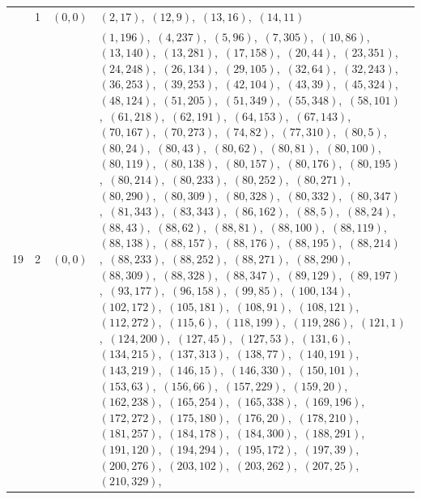 \documentclass[11pt]{article}
\begin{document}
\begin{longtable}{@{}rrl>{\raggedright\arraybackslash}p{}@{}}
\addlinespace[3pt]
19 & 1 & $(0,0)$ & $(2,17)$,\allowbreak\ $(12,9)$,\allowbreak\ $(13,16)$,\allowbreak\ $(14,11)$\\
19 & 2 & $(0,0)$ & $(1,196)$,\allowbreak\ $(4,237)$,\allowbreak\ $(5,96)$,\allowbreak\ $(7,305)$,\allowbreak\ $(10,86)$,\allowbreak\ $(13,140)$,\allowbreak\ $(13,281)$,\allowbreak\ $(17,158)$,\allowbreak\ $(20,44)$,\allowbreak\ $(23,351)$,\allowbreak\ $(24,248)$,\allowbreak\ $(26,134)$,\allowbreak\ $(29,105)$,\allowbreak\ $(32,64)$,\allowbreak\ $(32,243)$,\allowbreak\ $(36,253)$,\allowbreak\ $(39,253)$,\allowbreak\ $(42,104)$,\allowbreak\ $(43,39)$,\allowbreak\ $(45,324)$,\allowbreak\ $(48,124)$,\allowbreak\ $(51,205)$,\allowbreak\ $(51,349)$,\allowbreak\ $(55,348)$,\allowbreak\ $(58,101)$,\allowbreak\ $(61,218)$,\allowbreak\ $(62,191)$,\allowbreak\ $(64,153)$,\allowbreak\ $(67,143)$,\allowbreak\ $(70,167)$,\allowbreak\ $(70,273)$,\allowbreak\ $(74,82)$,\allowbreak\ $(77,310)$,\allowbreak\ $(80,5)$,\allowbreak\ $(80,24)$,\allowbreak\ $(80,43)$,\allowbreak\ $(80,62)$,\allowbreak\ $(80,81)$,\allowbreak\ $(80,100)$,\allowbreak\ $(80,119)$,\allowbreak\ $(80,138)$,\allowbreak\ $(80,157)$,\allowbreak\ $(80,176)$,\allowbreak\ $(80,195)$,\allowbreak\ $(80,214)$,\allowbreak\ $(80,233)$,\allowbreak\ $(80,252)$,\allowbreak\ $(80,271)$,\allowbreak\ $(80,290)$,\allowbreak\ $(80,309)$,\allowbreak\ $(80,328)$,\allowbreak\ $(80,332)$,\allowbreak\ $(80,347)$,\allowbreak\ $(81,343)$,\allowbreak\ $(83,343)$,\allowbreak\ $(86,162)$,\allowbreak\ $(88,5)$,\allowbreak\ $(88,24)$,\allowbreak\ $(88,43)$,\allowbreak\ $(88,62)$,\allowbreak\ $(88,81)$,\allowbreak\ $(88,100)$,\allowbreak\ $(88,119)$,\allowbreak\ $(88,138)$,\allowbreak\ $(88,157)$,\allowbreak\ $(88,176)$,\allowbreak\ $(88,195)$,\allowbreak\ $(88,214)$,\allowbreak\ $(88,233)$,\allowbreak\ $(88,252)$,\allowbreak\ $(88,271)$,\allowbreak\ $(88,290)$,\allowbreak\ $(88,309)$,\allowbreak\ $(88,328)$,\allowbreak\ $(88,347)$,\allowbreak\ $(89,129)$,\allowbreak\ $(89,197)$,\allowbreak\ $(93,177)$,\allowbreak\ $(96,158)$,\allowbreak\ $(99,85)$,\allowbreak\ $(100,134)$,\allowbreak\ $(102,172)$,\allowbreak\ $(105,181)$,\allowbreak\ $(108,91)$,\allowbreak\ $(108,121)$,\allowbreak\ $(112,272)$,\allowbreak\ $(115,6)$,\allowbreak\ $(118,199)$,\allowbreak\ $(119,286)$,\allowbreak\ $(121,1)$,\allowbreak\ $(124,200)$,\allowbreak\ $(127,45)$,\allowbreak\ $(127,53)$,\allowbreak\ $(131,6)$,\allowbreak\ $(134,215)$,\allowbreak\ $(137,313)$,\allowbreak\ $(138,77)$,\allowbreak\ $(140,191)$,\allowbreak\ $(143,219)$,\allowbreak\ $(146,15)$,\allowbreak\ $(146,330)$,\allowbreak\ $(150,101)$,\allowbreak\ $(153,63)$,\allowbreak\ $(156,66)$,\allowbreak\ $(157,229)$,\allowbreak\ $(159,20)$,\allowbreak\ $(162,238)$,\allowbreak\ $(165,254)$,\allowbreak\ $(165,338)$,\allowbreak\ $(169,196)$,\allowbreak\ $(172,272)$,\allowbreak\ $(175,180)$,\allowbreak\ $(176,20)$,\allowbreak\ $(178,210)$,\allowbreak\ $(181,257)$,\allowbreak\ $(184,178)$,\allowbreak\ $(184,300)$,\allowbreak\ $(188,291)$,\allowbreak\ $(191,120)$,\allowbreak\ $(194,294)$,\allowbreak\ $(195,172)$,\allowbreak\ $(197,39)$,\allowbreak\ $(200,276)$,\allowbreak\ $(203,102)$,\allowbreak\ $(203,262)$,\allowbreak\ $(207,25)$,\allowbreak\ $(210,329)$,\allowbreak\ 
\end{longtable}
\end{document}
